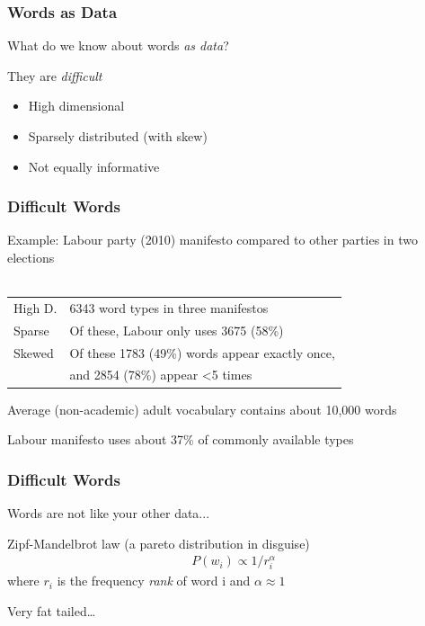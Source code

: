 \documentclass[11pt,compress,professionalfonts]{beamer}
\newcommand{\ita}{\begin{itemize}}
\newcommand{\itm}{\item[]}
\newcommand{\itz}{\end{itemize}}
\begin{document}
\begin{frame}[t]\frametitle{Words as Data}

What do we know about words \textit{as data}?

They are \textit{difficult}
\ita
\itm High dimensional
\itm Sparsely distributed (with skew)
\itm Not equally informative
\itz


\end{frame}
\begin{frame}[t]\frametitle{Difficult Words}

Example: Labour party (2010) manifesto compared to other parties in two elections\\
~\\
\begin{tabular}{ll}
High D. & 6343 word types in three manifestos \\
Sparse & Of these, Labour only uses 3675 (58\%)\\
Skewed &  Of these 1783 (49\%) words appear exactly once,\\
&  and 2854 (78\%) appear <5 times
\end{tabular}

Average (non-academic) adult vocabulary contains about 10,000 words

Labour manifesto uses about 37\% of commonly available types



\end{frame}
\begin{frame}[t]\frametitle{Difficult Words}

Words are not like your other data...

Zipf-Mandelbrot law (a pareto distribution in disguise)
\begin{align*}
P(w_i) \propto 1/{r_i^\alpha}
\end{align*}
where $r_i$ is the frequency \textsl{rank} of word i and $\alpha\approx 1$

Very fat tailed\ldots

\end{frame}
\end{document}
